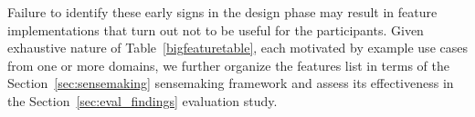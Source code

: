 {\begin{denselist}
  \end{denselist}
  \par Failure to identify these early signs in the design phase may result in feature implementations that turn out not to be useful for the participants. Given exhaustive nature of Table~\ref{bigfeaturetable}, each motivated by example use cases from one or more domains, we further organize the features list in terms of the Section~\ref{sec:sensemaking} sensemaking framework and assess its effectiveness in the Section~\ref{sec:eval_findings} evaluation study.
}


